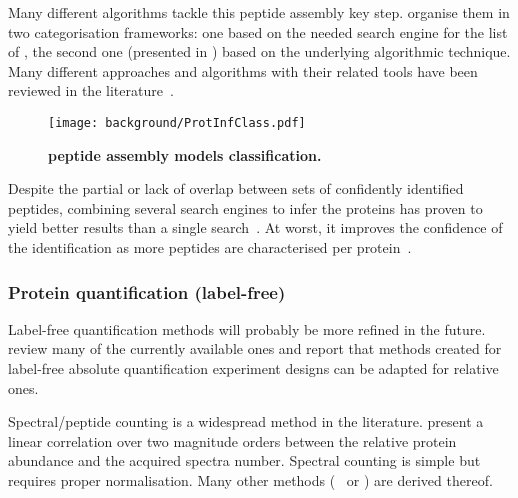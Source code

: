 Many different algorithms tackle this peptide assembly key step.
\citet{Huang2012-nr} organise them in two categorisation frameworks:
one based on the needed search engine for the list of \psms,
the second one (presented in )
based on the underlying algorithmic technique.
Many different approaches and algorithms with their related tools
have been reviewed in the literature~.\mybr\

\begin{figure}[!htb]
    \texttt{[image: background/ProtInfClass.pdf]}\centering
    \caption[Peptide assembly models classification]{\label{fig:ProtInfClass}%
    \textbf{\citet{Huang2012-nr} peptide assembly models classification.}
    }
\end{figure}

Despite the partial or lack of overlap between
sets of confidently identified peptides,
combining several search engines to infer the proteins
has proven to yield better results than a single search~.
At worst, it improves the confidence of the identification
as more peptides are characterised per protein~.\mybr\

\subsubsection{Protein quantification (label-free)}\label{subsubsec:protQuantLB}

Label-free quantification methods will probably be more refined in the future.
\citet{Nikolov2012-hq} review many of the currently available ones and report that
methods created for label-free absolute quantification experiment designs
can be adapted for relative ones.\mybr\

Spectral/peptide counting is a widespread method in the literature.
\citet{Liu2004-cj} present a linear correlation over two magnitude orders
between the relative protein abundance and the acquired spectra number.
Spectral counting is simple but requires proper normalisation.
Many other methods (\eg\  or )
are derived thereof.

